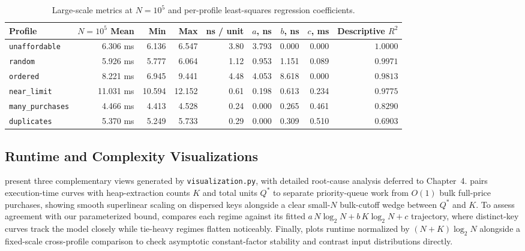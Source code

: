 \documentclass[10pt, a4paper]{article}
\newcommand{\code}[1]{\texttt{\color{primary!90!black}#1}}
\begin{document}
\begin{table}[H]
\centering
\caption{Large-scale metrics at $N = 10^5$ and per-profile least-squares regression coefficients.}
\label{tab:summary_fit}
\renewcommand{\arraystretch}{0.98}
\setlength{\tabcolsep}{4.0pt}
\footnotesize
\begin{tabular}{@{}l rrr r rrrr@{}}
\toprule
\textbf{\color{primary}Profile} & \textbf{\color{primary}$N\!=\!10^5$ Mean} & \textbf{\color{primary}Min} & \textbf{\color{primary}Max} & \textbf{\color{primary}ns / unit} & \textbf{\color{primary}$a$, ns} & \textbf{\color{primary}$b$, ns} & \textbf{\color{primary}$c$, ms} & \textbf{\color{primary}Descriptive $R^2$} \\
\midrule
\code{unaffordable}   &  6.306 ms &  6.136 &  6.547 & 3.80 & 3.793 & 0.000 & 0.000 & $\mathbf{1.0000}$ \\
\code{random}         &  5.926 ms &  5.777 &  6.064 & 1.12 & 0.953 & 1.151 & 0.089 & $\mathbf{0.9971}$ \\
\code{ordered}        &  8.221 ms &  6.945 &  9.441 & 4.48 & 4.053 & 8.618 & 0.000 & $\mathbf{0.9813}$ \\
\code{near\_limit}    & 11.031 ms & 10.594 & 12.152 & 0.61 & 0.198 & 0.613 & 0.234 & $\mathbf{0.9775}$ \\
\code{many\_purchases}&  4.466 ms &  4.413 &  4.528 & 0.24 & 0.000 & 0.265 & 0.461 & $0.8290$ \\
\code{duplicates}     &  5.370 ms &  5.249 &  5.733 & 0.29 & 0.000 & 0.309 & 0.510 & $0.6903$ \\
\bottomrule
\end{tabular}
\end{table}

\subsection{Runtime and Complexity Visualizations}
 present three complementary views generated by \code{visualization.py}, with detailed root-cause analysis deferred to Chapter~4.  pairs execution-time curves with heap-extraction counts $K$ and total units $Q^*$ to separate priority-queue work from $O(1)$ bulk full-price purchases, showing smooth superlinear scaling on dispersed keys alongside a clear small-$N$ bulk-cutoff wedge between $Q^*$ and $K$. To assess agreement with our parameterized bound,  compares each regime against its fitted $a\,N\log_2 N + b\,K\log_2 N + c$ trajectory, where distinct-key curves track the model closely while tie-heavy regimes flatten noticeably. Finally,  plots runtime normalized by $(N + K)\log_2 N$ alongside a fixed-scale cross-profile comparison to check asymptotic constant-factor stability and contrast input distributions directly.
\end{document}
